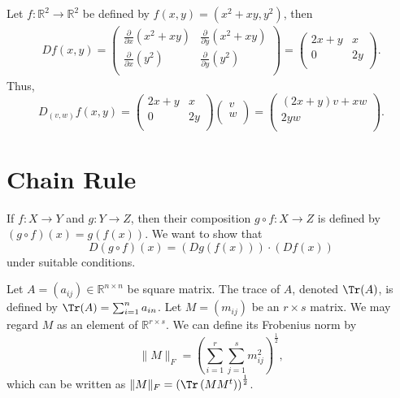 \begin{eg}
    Let \(f : \mathbb{R} ^2 \to \mathbb{R} ^2\) be defined by \(f(x, y) = (x^2 + xy, y^2)\), then 
    \begin{align*}
        Df(x, y) = \begin{pmatrix}
            \frac{\partial}{\partial x} (x^2 + xy)  & \frac{\partial}{\partial y} (x^2 + xy)   \\
            \frac{\partial}{\partial x}(y^2)  & \frac{\partial}{\partial y} (y^2)  \\
        \end{pmatrix} = \begin{pmatrix}
            2x + y & x  \\
            0 & 2y  \\
        \end{pmatrix}.
    \end{align*}  
    Thus, 
    \[
        D_{(v, w)}f(x, y) = \begin{pmatrix}
            2x + y & x  \\
            0 & 2y  \\
        \end{pmatrix} \begin{pmatrix}
             v \\
             w \\
        \end{pmatrix} = \begin{pmatrix}
             (2x + y)v + xw \\
             2yw \\
        \end{pmatrix}.
    \]
\end{eg}

\section{Chain Rule}

If \(f : X \to Y\) and \(g: Y \to Z\), then their composition \(g \circ f : X \to Z\) is defined by \((g \circ f)(x) = g(f(x))\). We want to show that 
\[
    D(g \circ f)(x) = (Dg(f(x))) \cdot (Df(x))
\]    
under suitable conditions. 

\begin{definition}
    Let \(A = \left( a_{ij} \right) \in \mathbb{R} ^{n \times n} \) be square matrix. The trace of \(A\), denoted \(\Tr (A)\), is defined by \(\Tr (A) = \sum_{i=1}^n a_{in} \). Let \(M = (m_{ij})\) be an \(r \times s\) matrix. We may regard \(M\) as an element of \(\mathbb{R} ^{r \times s}\). We can define its Frobenius norm by 
    \[
        \lVert M \rVert_F = \left( \sum_{i=1}^r \sum_{j=1}^s m_{ij}^2   \right)^{\frac{1}{2}},  
    \]       
    which can be written as \(\lVert M \rVert_F = \left( \Tr \left( MM^t  \right) \right)^{\frac{1}{2}}  \). 
\end{definition}

